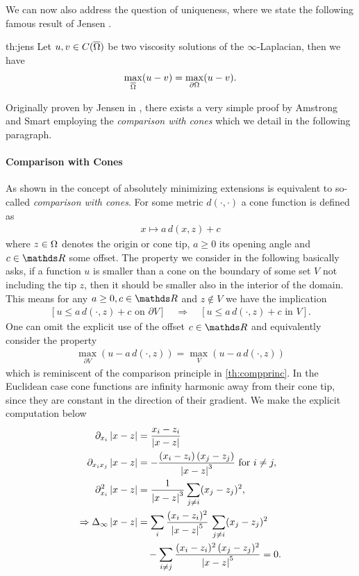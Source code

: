 We can now also address the question of uniqueness, where we state the following famous result of Jensen \cite{jensen1993uniqueness}.
%
\begin{theorem}{\cite{jensen1993uniqueness}}{th:jens} 
Let $u,v\in C(\overline{\Omega})$ be two viscosity solutions of the $\infty$-Laplacian, then we have
%
\begin{align*}
\max_{\overline{\Omega}} (u - v) = \max_{\partial\Omega} (u - v).
\end{align*}
\end{theorem}
%
%
\noindent%
Originally proven by Jensen in \cite{jensen1993uniqueness}, there exists a very simple proof by Amstrong and Smart \cite{armstrong2010easy} employing the \emph{comparison with cones} which we detail in the following paragraph.
%
%
%
\paragraph{Comparison with Cones} As shown in \cite{aronsson2004tour} the concept of absolutely minimizing extensions is equivalent to so-called \emph{comparison with cones}. For some metric $d(\cdot,\cdot)$ a cone function is defined as
%
\begin{align*}
x\mapsto a\, d(x,z) + c
\end{align*}
%
where $z\in\Omega$ denotes the origin or cone tip, $a\geq 0$ its opening angle and $c\in\R$ some offset. The property we consider in the following basically asks, if a function $u$ is smaller than a cone on the boundary of some set $V$ not including the tip $z$, then it should be smaller also in the interior of the domain. This means for any $a\geq 0,c\in\R$ and $z\notin V$ we have the implication
%
\begin{align*}
\left[u \leq a\, d(\cdot,z) + c \text{ on }\partial V\right]
\quad \Rightarrow\quad
\left[u \leq a\, d(\cdot,z) + c \text{ in } V\right].
\end{align*}
%
%
One can omit the explicit use of the offset $c\in\R$ and equivalently consider the property
%
\begin{align}\label{eq:conecont}
\max_{\partial V}\left(u - a\, d(\cdot,z)\right) = \max_{V}\left(u - a\, d(\cdot,z)\right)
\end{align}
%
which is reminiscent of the comparison principle in \cref{th:compprinc}. In the Euclidean case cone functions are infinity harmonic away from their cone tip, since they are constant in the direction of their gradient. We make the explicit computation below
%
\begin{align*}
\partial_{x_i} \abs{x-z} &= \frac{x_i - z_i}{\abs{x-z}}\\
\partial_{x_i x_j}\abs{x-z} &= -\frac{(x_i - z_i)\, (x_j - z_j)}{\abs{x-z}^3}\text{ for } i\neq j,\\
\partial_{x_i}^2\abs{x-z} &= \frac{1}{\abs{x-z}^3} \sum_{j\neq i} (x_j - z_j)^2,\\
\Rightarrow
\Delta_\infty \abs{x-z} &= 
%
\sum_{i} \frac{(x_i - z_i)^2}{\abs{x-z}^5} \, \sum_{j\neq i} (x_j - z_j)^2\\
&\quad-\sum_{i\neq j}\frac{(x_i - z_i)^2\, (x_j - z_j)^2}{\abs{x-z}^5} = 0.
\end{align*}
